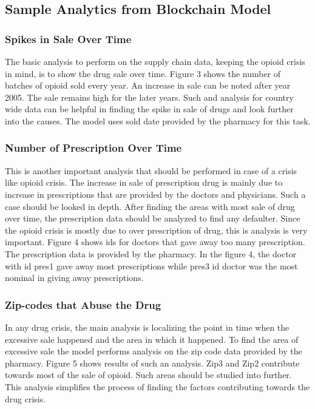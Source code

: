 \documentclass[sigconf]{acmart}
\begin{document}
\subsection{Sample Analytics from Blockchain Model}

\subsubsection{Spikes in Sale Over Time} The basic analysis to perform on the supply chain data, keeping the opioid crisis in mind, is to show the drug sale over time. Figure 3 shows the number of batches of opioid sold every year. An increase in sale can be noted after year 2005. The sale remains high for the later years. Such and analysis for country wide data can be helpful in finding the spike in sale of drugs and look further into the causes. The model uses sold date provided by the pharmacy for this task.

\subsubsection{Number of Prescription Over Time}
This is another important analysis that should be performed in case of a crisis like opioid crisis. The increase in sale of prescription drug is mainly due to increase in prescriptions that are provided by the doctors and physicians. Such a case should be looked in depth. After finding the areas with most sale of drug over time, the prescription data should be analyzed to find any defaulter. Since the opioid crisis is mostly due to over prescription of drug, this is analysis is very important. Figure 4 shows ids for doctors that gave away too many prescription. The prescription data is provided by the pharmacy. In the figure 4, the doctor with id pres1 gave away most prescriptions while pres3 id doctor was the most nominal in giving away prescriptions. 

\subsubsection{Zip-codes that Abuse the Drug} 
In any drug crisis, the main analysis is localizing the point in time when the excessive sale happened and the area in which it happened. To find the area of excessive sale the model performs analysis on the zip code data provided by the pharmacy. Figure 5 shows results of such an analysis. Zip3 and Zip2 contribute towards most of the sale of opioid. Such areas should be studied into further. This analysis simplifies the process of finding the factors contributing towards the drug crisis.
\end{document}
